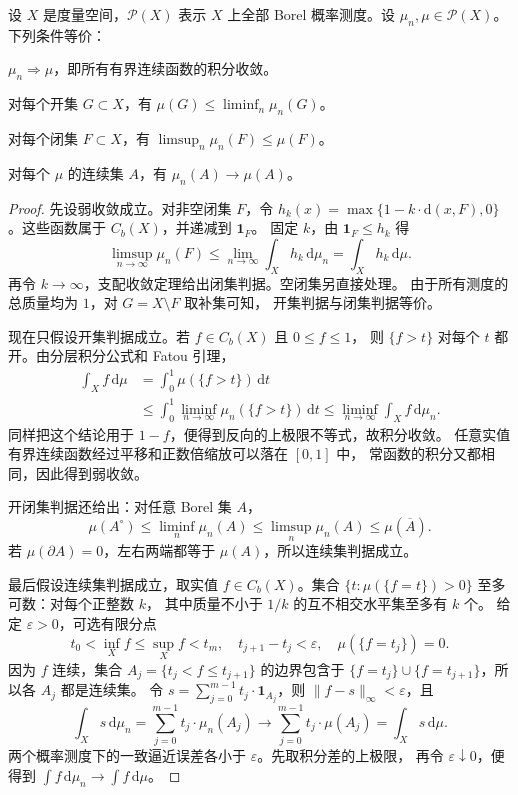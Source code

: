 \begin{theorem}[Portmanteau]\label{b1:thm:portmanteau}
设 \(X\) 是度量空间，\(\mathcal P(X)\) 表示 \(X\) 上全部 Borel 概率测度。设 \(\mu_n,\mu\in\mathcal P(X)\)。下列条件等价：
\begin{equivalences}
\item\label{b1:item:portmanteau-continuous}
\(\mu_n\Rightarrow\mu\)，即所有有界连续函数的积分收敛。
\item\label{b1:item:portmanteau-open}
对每个开集 \(G\subset X\)，有 \(\mu(G)\leq\liminf_n\mu_n(G)\)。
\item\label{b1:item:portmanteau-closed}
对每个闭集 \(F\subset X\)，有 \(\limsup_n\mu_n(F)\leq\mu(F)\)。
\item\label{b1:item:portmanteau-continuity-set}
对每个 \(\mu\) 的连续集 \(A\)，有 \(\mu_n(A)\to\mu(A)\)。
\end{equivalences}
\end{theorem}
\begin{proof}
先设弱收敛成立。对非空闭集 \(F\)，令
\(h_k(x)=\max\{1-k\cdot \mathrm{d}(x,F),0\}\)。这些函数属于 \(C_b(X)\)，并递减到 \(\mathbf1_F\)。
固定 \(k\)，由 \(\mathbf1_F\leq h_k\) 得
\[
 \limsup_{n\to\infty}\mu_n(F)
 \leq\lim_{n\to\infty}\int_X h_k\,\mathrm{d}\mu_n
 =\int_X h_k\,\mathrm{d}\mu.
\]
再令 \(k\to\infty\)，支配收敛定理给出闭集判据。空闭集另直接处理。
由于所有测度的总质量均为 \(1\)，对 \(G=X\setminus F\) 取补集可知，
开集判据与闭集判据等价。

现在只假设开集判据成立。若 \(f\in C_b(X)\) 且 \(0\leq f\leq1\)，
则 \(\{f>t\}\) 对每个 \(t\) 都开。由分层积分公式和 Fatou 引理，
\[
 \begin{aligned}
 \int_X f\,\mathrm{d}\mu
 &=\int_0^1\mu(\{f>t\})\,\mathrm{d}t\\
 &\leq\int_0^1\liminf_{n\to\infty}\mu_n(\{f>t\})\,\mathrm{d}t
 \leq\liminf_{n\to\infty}\int_X f\,\mathrm{d}\mu_n.
 \end{aligned}
\]
同样把这个结论用于 \(1-f\)，便得到反向的上极限不等式，故积分收敛。
任意实值有界连续函数经过平移和正数倍缩放可以落在 \([0,1]\) 中，
常函数的积分又都相同，因此得到弱收敛。

开闭集判据还给出：对任意 Borel 集 \(A\)，
\[
 \mu(A^\circ)\leq\liminf_n\mu_n(A)
 \leq\limsup_n\mu_n(A)\leq\mu(\overline A).
\]
若 \(\mu(\partial A)=0\)，左右两端都等于 \(\mu(A)\)，所以连续集判据成立。

最后假设连续集判据成立，取实值 \(f\in C_b(X)\)。集合
\(\{t:\mu(\{f=t\})>0\}\) 至多可数：对每个正整数 \(k\)，
其中质量不小于 \(1/k\) 的互不相交水平集至多有 \(k\) 个。
给定 \(\varepsilon>0\)，可选有限分点
\[
 t_0<\inf_X f\leq\sup_X f<t_m,
 \quad t_{j+1}-t_j<\varepsilon,
 \quad \mu(\{f=t_j\})=0.
\]
因为 \(f\) 连续，集合 \(A_j=\{t_j<f\leq t_{j+1}\}\) 的边界包含于
\(\{f=t_j\}\cup\{f=t_{j+1}\}\)，所以各 \(A_j\) 都是连续集。
令 \(s=\sum_{j=0}^{m-1}t_j\cdot\mathbf1_{A_j}\)，则 \(\|f-s\|_\infty<\varepsilon\)，且
\[
 \int_X s\,\mathrm{d}\mu_n
 =\sum_{j=0}^{m-1}t_j\cdot\mu_n(A_j)
 \longrightarrow\sum_{j=0}^{m-1}t_j\cdot\mu(A_j)=\int_X s\,\mathrm{d}\mu.
\]
两个概率测度下的一致逼近误差各小于 \(\varepsilon\)。先取积分差的上极限，
再令 \(\varepsilon\downarrow0\)，便得到 \(\int f\,\mathrm{d}\mu_n\to\int f\,\mathrm{d}\mu\)。
\end{proof}

